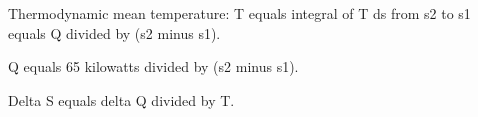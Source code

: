 Thermodynamic mean temperature:  
T equals integral of T ds from s2 to s1 equals Q divided by (s2 minus s1).  

Q equals 65 kilowatts divided by (s2 minus s1).  

Delta S equals delta Q divided by T.